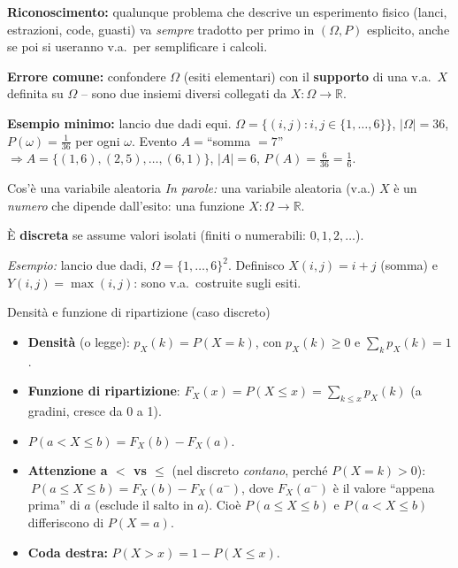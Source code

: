 \documentclass[11pt]{article}
\newcommand{\inparole}[1]{\emph{In parole:} #1}
\begin{document}
\begin{trucco}
\textbf{Riconoscimento:} qualunque problema che descrive un esperimento fisico (lanci, estrazioni, code, guasti) va \emph{sempre} tradotto per primo in $(\Omega,P)$ esplicito, anche se poi si useranno v.a.\ per semplificare i calcoli.

\textbf{Errore comune:} confondere $\Omega$ (esiti elementari) con il \textbf{supporto} di una v.a.\ $X$ definita su $\Omega$ -- sono due insiemi diversi collegati da $X:\Omega\to\mathbb{R}$.

\textbf{Esempio minimo:} lancio due dadi equi. $\Omega=\{(i,j): i,j\in\{1,\dots,6\}\}$, $|\Omega|=36$, $P(\omega)=\tfrac{1}{36}$ per ogni $\omega$. Evento $A=$``somma $=7$'' $\Rightarrow A=\{(1,6),(2,5),\dots,(6,1)\}$, $|A|=6$, $P(A)=\tfrac{6}{36}=\tfrac{1}{6}$.
\end{trucco}

\begin{concetto}[barBlue]{Cos'\`e una variabile aleatoria}
\inparole{una variabile aleatoria (v.a.) $X$ \`e un \emph{numero} che dipende dall'esito: una funzione $X:\Omega \to \mathbb{R}$.}

\`E \textbf{discreta} se assume valori isolati (finiti o numerabili: $0,1,2,\dots$).

\emph{Esempio:} lancio due dadi, $\Omega=\{1,\dots,6\}^2$. Definisco $X(i,j)=i+j$ (somma) e $Y(i,j)=\max(i,j)$: sono v.a.\ costruite sugli esiti.
\end{concetto}

\begin{concetto}[barBlue]{Densit\`a e funzione di ripartizione (caso discreto)}
\begin{itemize}[leftmargin=1.2em,itemsep=2pt,topsep=2pt]
\item \textbf{Densit\`a} (o legge): $p_X(k) = P(X=k)$, con $p_X(k)\ge 0$ e $\sum_k p_X(k)=1$.
\item \textbf{Funzione di ripartizione}: $F_X(x) = P(X \le x) = \sum_{k \le x} p_X(k)$ (a gradini, cresce da 0 a 1).
\item $P(a < X \le b) = F_X(b) - F_X(a)$.
\item \textbf{Attenzione a $<$ vs $\le$} (nel discreto \emph{contano}, perch\'e $P(X=k)>0$): $\ P(a \le X \le b) = F_X(b) - F_X(a^-)$, dove $F_X(a^-)$ \`e il valore ``appena prima'' di $a$ (esclude il salto in $a$). Cio\`e $P(a\le X\le b)$ e $P(a<X\le b)$ differiscono di $P(X=a)$.
\item \textbf{Coda destra:} $P(X > x) = 1 - P(X \le x)$.
\end{itemize}
\end{concetto}
\end{document}

